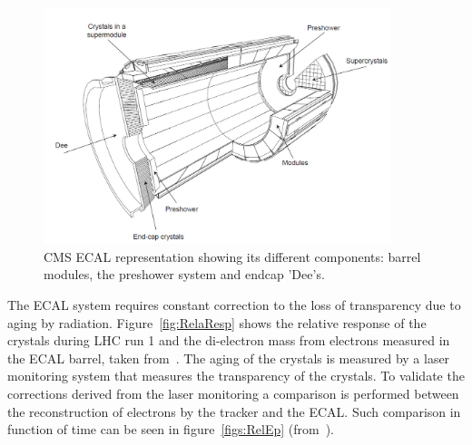 \begin{figure}[!Hhtbp]
  \begin{center}
    \includegraphics[width=0.9\textwidth]{figs/ECAL.png}
    \caption{CMS ECAL representation showing its different components: barrel modules, the preshower system and endcap 'Dee's.}
    \label{fig:ecal}
  \end{center}
\end{figure}

The ECAL system requires constant correction to the loss of transparency due to aging by radiation. Figure~\ref{fig:RelaResp} shows the relative response of the crystals during LHC run 1 and the di-electron mass from electrons measured in the ECAL barrel, taken from~\cite{CMS-DP-2012-015}. The aging of the crystals is measured by a laser monitoring system that measures the transparency of the crystals. To validate the corrections derived from the laser monitoring a comparison is performed between the reconstruction of electrons by the tracker and the ECAL. Such comparison in function of time can be seen in figure~\ref{figs:RelEp} (from~\cite{CMS-DP-2012-015}).

